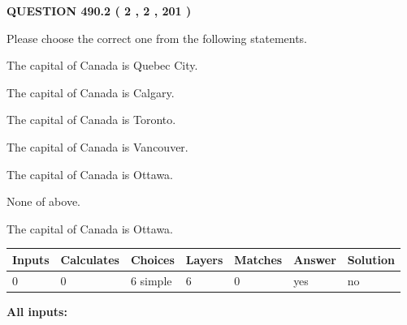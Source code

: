 \documentclass[12pt]{article}
\begin{document}
   
  
\vspace{0.2in}
  
{\textbf{\Large{QUESTION
490.2 
 ( 2 , 2 , 201 )
}}}
  
  
Please choose the correct one from the following statements.
 
 
The capital of Canada is Quebec City.
 
 
The capital of Canada is Calgary.
 
 
The capital of Canada is Toronto.
 
 
The capital of Canada is Vancouver.
 
 
The capital of Canada is Ottawa.
 
 
 None of above.
 
 
\noindent{}
 
 
The capital of Canada is Ottawa.
 
 
\noindent{}
 
 
   
   
   
   
\noindent\begin{tabular}{|l|l|l|l|l|l|l|}
 \hline
Inputs & Calculates & Choices & Layers & Matches & Answer & Solution \\ \hline
 0  & 
 0  & 
 6
  simple  
  & 
 6  & 
 0  & 
  yes & 
  no 
  \\ \hline
 \end{tabular}
   
   
   
   
\noindent{}
   
   
   
   
\noindent\vspace{0.1in}\hspace{-0.08in} {\textbf{\Large{All inputs: }}}
   
   
   
   
   
   
 \vspace{0.2in}
 
   
   
\end{document}
